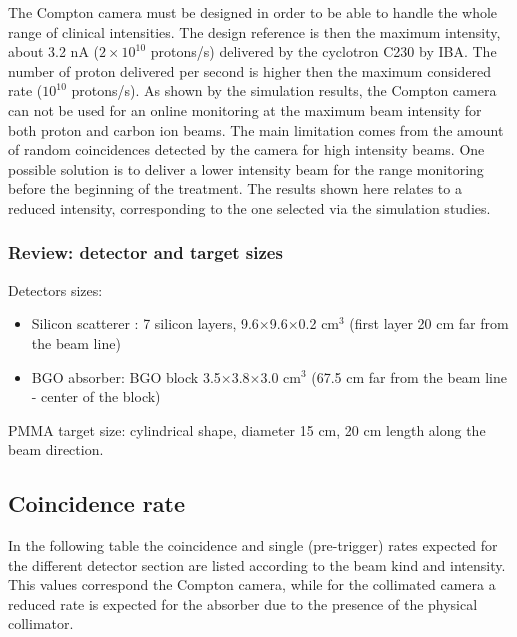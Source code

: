The Compton camera must be designed in order to be able to handle the whole range of clinical intensities. The design reference is then the maximum intensity, about 3.2 nA ($2\times10^{10}$ protons/s) delivered by the cyclotron C230 by IBA. The number of proton delivered per second is higher then the maximum considered rate ($10^{10}$ protons/s).\newline
As shown by the simulation results, the Compton camera can not be used for an online monitoring at the maximum beam intensity for both proton and carbon ion beams. The main limitation comes from the amount of random coincidences detected by the camera for high intensity beams. One possible solution is to deliver a lower intensity beam for the range monitoring before the beginning of the treatment. The results shown here relates to a reduced intensity, corresponding to the one selected via the simulation studies.
\newpage
\subsubsection{Review: detector and target sizes\newline}

Detectors sizes:
\begin{itemize}
	\item Silicon scatterer : 7 silicon layers, 9.6$\times$9.6$\times$0.2 cm$\mathrm{^{3}}$ (first layer 20 cm far from the beam line)
	\item BGO absorber: BGO block 3.5$\times$3.8$\times$3.0 cm$\mathrm{^{3}}$ (67.5 cm far from the beam line - center of the block)\newline
\end{itemize}
PMMA target size: cylindrical shape, diameter 15 cm,  20 cm length along the beam direction.


\subsection{Coincidence rate\newline}

In the following table the coincidence and single (pre-trigger) rates expected for the different detector section are listed according to the beam kind and intensity. This values correspond the Compton camera, while for the collimated camera a reduced rate is expected for the absorber due to the presence of the physical collimator.

